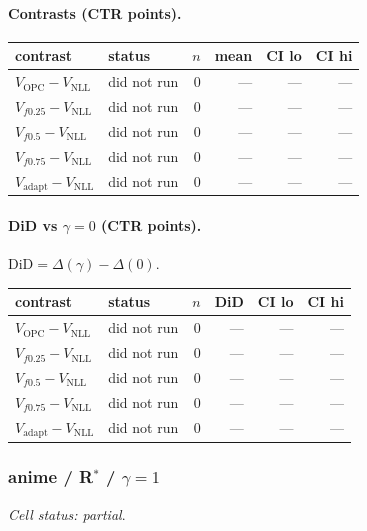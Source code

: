 \documentclass[10pt,a4paper]{article}
\begin{document}
\paragraph{Contrasts (CTR points).}
{\centering\small\begin{tabular}{llrrrr}
\toprule contrast & status & $n$ & mean & CI lo & CI hi \\
\midrule
$V_{\mathrm{OPC}}-V_{\mathrm{NLL}}$ & did not run & 0 & --- & --- & --- \\
$V_{f0.25}-V_{\mathrm{NLL}}$ & did not run & 0 & --- & --- & --- \\
$V_{f0.5}-V_{\mathrm{NLL}}$ & did not run & 0 & --- & --- & --- \\
$V_{f0.75}-V_{\mathrm{NLL}}$ & did not run & 0 & --- & --- & --- \\
$V_{\mathrm{adapt}}-V_{\mathrm{NLL}}$ & did not run & 0 & --- & --- & --- \\
\bottomrule\end{tabular}\par}
\paragraph{DiD vs $\gamma=0$ (CTR points).} $\mathrm{DiD}=\Delta(\gamma)-\Delta(0)$.
{\centering\small\begin{tabular}{llrrrr}
\toprule contrast & status & $n$ & DiD & CI lo & CI hi \\
\midrule
$V_{\mathrm{OPC}}-V_{\mathrm{NLL}}$ & did not run & 0 & --- & --- & --- \\
$V_{f0.25}-V_{\mathrm{NLL}}$ & did not run & 0 & --- & --- & --- \\
$V_{f0.5}-V_{\mathrm{NLL}}$ & did not run & 0 & --- & --- & --- \\
$V_{f0.75}-V_{\mathrm{NLL}}$ & did not run & 0 & --- & --- & --- \\
$V_{\mathrm{adapt}}-V_{\mathrm{NLL}}$ & did not run & 0 & --- & --- & --- \\
\bottomrule\end{tabular}\par}
\bigskip
\subsubsection{anime / R$^*$ / $\gamma=1$}
\emph{Cell status: partial}.
\end{document}
